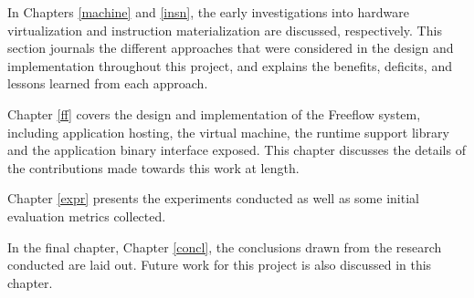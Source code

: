 In Chapters \ref{machine} and \ref{insn}, the early investigations into
hardware virtualization and instruction materialization are discussed, 
respectively. This section journals the different approaches that were 
considered in the design and implementation throughout this project, and 
explains the benefits, deficits, and lessons learned from each approach.

Chapter \ref{ff} covers the design and implementation of the Freeflow system,
including application hosting, the virtual machine, the runtime support 
library and the application binary interface exposed. This chapter discusses 
the details of the contributions made towards this work at length.

Chapter \ref{expr} presents the experiments conducted as well as some initial
evaluation metrics collected.

In the final chapter, Chapter \ref{concl}, the conclusions drawn from the
research conducted are laid out. Future work for this project is also discussed
in this chapter.